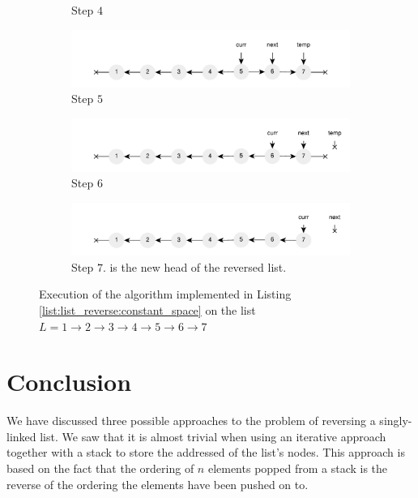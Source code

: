 \begin{figure}
\begin{subfigure}[t]{0.49\textwidth}
		\caption[]{Step $4$}
		\label{fig:list_reverse:list_reverse_iterative4}
	 \end{subfigure}
	 \hfill
	 \begin{subfigure}[t]{0.49\textwidth}
		\centering
		\includegraphics[width=\textwidth]{sources/list_reverse/images/list_reverse_iterative5}
		\caption[]{Step $5$}
		\label{fig:list_reverse:list_reverse_iterative5}
	 \end{subfigure}
	 \hfill
	 \begin{subfigure}[t]{0.49\textwidth}
		\centering
		\includegraphics[width=\textwidth]{sources/list_reverse/images/list_reverse_iterative6}
		\caption[]{Step $6$}
		\label{fig:list_reverse:list_reverse_iterative6}
	 \end{subfigure}
	 \hfill
	 \begin{subfigure}[t]{0.49\textwidth}
		\centering
		\includegraphics[width=\textwidth]{sources/list_reverse/images/list_reverse_iterative7}
		\caption[]{Step $7$.  is the new head of the reversed list.}
		\label{fig:list_reverse:list_reverse_iterative7}
	 \end{subfigure}
\caption{Execution of the algorithm implemented in Listing \ref{list:list_reverse:constant_space} on the list $L = 1 \rightarrow 2 \rightarrow 3 \rightarrow 4 \rightarrow 5 \rightarrow 6 \rightarrow 7$}
\label{fig:list_reverse:list_reverse_iterative_execution}
\end{figure}

\section{Conclusion}
We have discussed three possible approaches to the problem of reversing a singly-linked list.
We saw that it is almost trivial when using an iterative approach together with a stack to store the addressed of the list's nodes. 
This approach is based on the fact that the ordering of $n$  elements popped from a stack is the reverse of the ordering the elements have been pushed on to.

